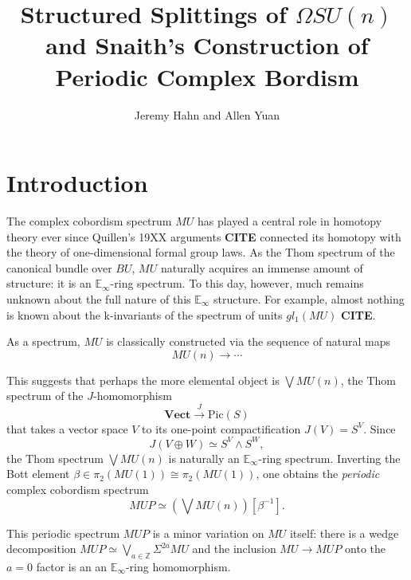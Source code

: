 \documentclass[oneside]{amsart}
\theoremstyle{definition}
\theoremstyle{plain}
\DeclareMathOperator{\smsh}{\wedge}
\begin{document}
\title{Structured Splittings of $\Omega SU(n)$ and Snaith's Construction of Periodic Complex Bordism}
\author{Jeremy Hahn and Allen Yuan}




\setcounter{tocdepth}{1}
\maketitle

\tableofcontents



\section{Introduction}

The complex cobordism spectrum $MU$ has played a central role in homotopy theory ever since Quillen's 19XX arguments \textbf{CITE} connected its homotopy with the theory of one-dimensional formal group laws.  As the Thom spectrum of the canonical bundle over $BU$, $MU$ naturally acquires an immense amount of structure: it is an $\mathbb{E}_\infty$-ring spectrum.  To this day, however, much remains unknown about the full nature of this $\mathbb{E}_\infty$ structure.  For example, almost nothing is known about the k-invariants of the spectrum of units $gl_1(MU)$ \textbf{CITE}.

As a spectrum, $MU$ is classically constructed via the sequence of natural maps
$$MU(n) \longrightarrow \cdots$$

This suggests that perhaps the more elemental object is $\bigvee MU(n)$, the Thom spectrum of the $J$-homomorphism
$$\textbf{Vect} \stackrel{J}{\longrightarrow} \text{Pic}(S)$$
that takes a vector space $V$ to its one-point compactification $J(V)=S^V$.  Since $$J(V \oplus W) \simeq S^V \smsh S^W,$$ the Thom spectrum $\bigvee MU(n)$
is naturally an $\mathbb{E}_\infty$-ring spectrum.  Inverting the Bott element $\beta \in \pi_2(MU(1)) \cong \pi_2(MU(1))$, one obtains the \textit{periodic} complex cobordism spectrum
$$MUP \simeq \left(\bigvee MU(n) \right)[\beta^{-1}].$$

This periodic spectrum $MUP$ is a minor variation on $MU$ itself: there is a wedge decomposition $MUP \simeq \bigvee_{a \in \mathbb{Z}} \Sigma^{2a} MU$ and the inclusion $MU \rightarrow MUP$ onto the $a=0$ factor is an an $\mathbb{E}_\infty$-ring homomorphism.
\end{document}
